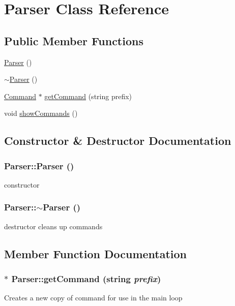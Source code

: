 \hypertarget{classParser}{
\section{Parser Class Reference}
\label{d0/d40/classParser}
}
\subsection*{Public Member Functions}
\begin{DoxyCompactItemize}
\item 
\hyperlink{classParser_a12234f6cd36b61af4b50c94a179422c1}{Parser} ()
\item 
\hyperlink{classParser_a3e658b5917a93a3ef648050d060e3a93}{$\sim$Parser} ()
\item 
\hyperlink{classCommand}{Command} $\ast$ \hyperlink{classParser_a76b5f7778dd0272abee80ab848a43960}{getCommand} (string prefix)
\item 
void \hyperlink{classParser_ab893322079a7bc6e6b2153da7d9468bd}{showCommands} ()
\end{DoxyCompactItemize}


\subsection{Constructor \& Destructor Documentation}
\hypertarget{classParser_a12234f6cd36b61af4b50c94a179422c1}{
\subsubsection[{Parser}]{\setlength{\rightskip}{0pt plus 5cm}Parser::Parser ()}}
\label{d0/d40/classParser_a12234f6cd36b61af4b50c94a179422c1}
constructor \hypertarget{classParser_a3e658b5917a93a3ef648050d060e3a93}{
\subsubsection[{$\sim$Parser}]{\setlength{\rightskip}{0pt plus 5cm}Parser::$\sim$Parser ()}}
\label{d0/d40/classParser_a3e658b5917a93a3ef648050d060e3a93}
destructor cleans up commands 

\subsection{Member Function Documentation}
\hypertarget{classParser_a76b5f7778dd0272abee80ab848a43960}{
\subsubsection[{getCommand}]{ $\ast$ Parser::getCommand (string {\em prefix})}}
\label{d0/d40/classParser_a76b5f7778dd0272abee80ab848a43960}
Creates a new copy of command for use in the main loop


